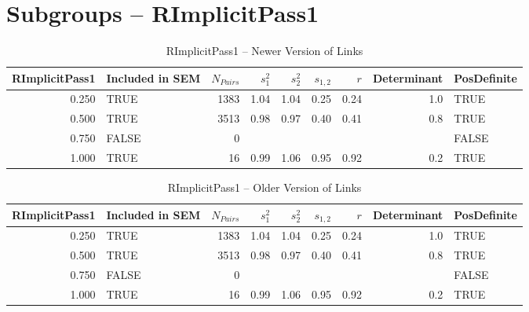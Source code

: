 \documentclass{article}\usepackage{graphicx, color}
\begin{document}
\section{Subgroups --  RImplicitPass1 }%
\begin{table}[ht]
\begin{center}
\begin{tabular}{rlrrrrrrl}
  \hline
RImplicitPass1 & Included in SEM & $N_{Pairs}$ & $s_1^2$ & $s_2^2$ & $s_{1,2}$ & $r$ & Determinant & PosDefinite \\ 
  \hline
0.250 & TRUE & 1383 & 1.04 & 1.04 & 0.25 & 0.24 & 1.0 & TRUE \\ 
  0.500 & TRUE & 3513 & 0.98 & 0.97 & 0.40 & 0.41 & 0.8 & TRUE \\ 
  0.750 & FALSE & 0 &  &  &  &  &  & FALSE \\ 
  1.000 & TRUE & 16 & 0.99 & 1.06 & 0.95 & 0.92 & 0.2 & TRUE \\ 
   \hline
\end{tabular}
\caption{RImplicitPass1 -- Newer Version of Links}
\end{center}
\end{table}
\begin{table}[ht]
\begin{center}
\begin{tabular}{rlrrrrrrl}
  \hline
RImplicitPass1 & Included in SEM & $N_{Pairs}$ & $s_1^2$ & $s_2^2$ & $s_{1,2}$ & $r$ & Determinant & PosDefinite \\ 
  \hline
0.250 & TRUE & 1383 & 1.04 & 1.04 & 0.25 & 0.24 & 1.0 & TRUE \\ 
  0.500 & TRUE & 3513 & 0.98 & 0.97 & 0.40 & 0.41 & 0.8 & TRUE \\ 
  0.750 & FALSE & 0 &  &  &  &  &  & FALSE \\ 
  1.000 & TRUE & 16 & 0.99 & 1.06 & 0.95 & 0.92 & 0.2 & TRUE \\ 
   \hline
\end{tabular}
\caption{RImplicitPass1 -- Older Version of Links}
\end{center}
\end{table}
\end{document}
